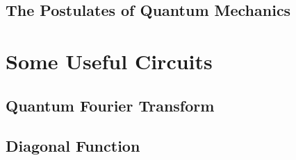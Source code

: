 \documentclass[
oneside,
11pt, a4paper,
footinclude=true,
headinclude=true,
cleardoublepage=empty
]{scrbook}
\begin{document}
\section{The Postulates of Quantum Mechanics}\label{sec:PostulatesQM}

\chapter{Some Useful Circuits}
\section{Quantum Fourier Transform}\label{sec:chapQFT}

\section{Diagonal Function}


\end{document}
